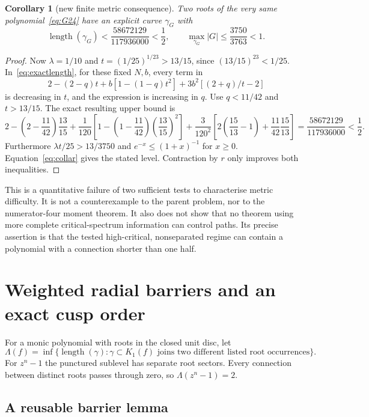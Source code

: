 \documentclass[11pt,a4paper]{article}
\newtheorem{corollary}[theorem]{Corollary}
\theoremstyle{remark}\newtheorem{remark}[theorem]{Remark}
\newcommand{\length}{\operatorname{length}}
\begin{document}
\begin{corollary}[new finite metric consequence]\label{cor:24}
Two roots of the very same polynomial~\eqref{eq:G24} have an explicit curve
$\gamma_G$ with
\[
 \length(\gamma_G)
 <\frac{58672129}{117936000}<\frac12,
 \qquad
 \max_{\gamma_G}|G|\le\frac{3750}{3763}<1.
\]
\end{corollary}
\begin{proof}
Now $\lambda=1/10$ and $t=(1/25)^{1/23}>13/15$, since
$(13/15)^{23}<1/25$. In~\eqref{eq:exactlength}, for these fixed $N,b$,
every term in
\[
 2-(2-q)t+b[1-(1-q)t^2]+3b^2[(2+q)/t-2]
\]
is decreasing in $t$, and the expression is increasing in $q$.
Use $q<11/42$ and $t>13/15$. The exact resulting upper bound is
\[
 2-\left(2-\frac{11}{42}\right)\frac{13}{15}
 +\frac1{120}\left[1-\left(1-\frac{11}{42}\right)
                 \left(\frac{13}{15}\right)^2\right]
 +\frac3{120^2}\left[2\left(\frac{15}{13}-1\right)
                    +\frac{11}{42}\frac{15}{13}\right]
 =\frac{58672129}{117936000}<\frac12.
\]
Furthermore $\lambda t/25>13/3750$ and $e^{-x}\le(1+x)^{-1}$ for $x\ge0$.
Equation~\eqref{eq:collar} gives the stated level. Contraction by $r$ only
improves both inequalities.
\end{proof}

This is a quantitative failure of two sufficient tests to characterise
metric difficulty. It is not a counterexample to the parent problem, nor
to the numerator-four moment theorem. It also does not show that no theorem
using more complete critical-spectrum information can control paths.
Its precise assertion is that the tested high-critical, nonseparated regime
can contain a polynomial with a connection shorter than one half.

\section{Weighted radial barriers and an exact cusp order}

For a monic polynomial with roots in the closed unit disc, let
\[
 \Lambda(f)=\inf\{\length(\gamma):\gamma\subset K_1(f)
     \text{ joins two different listed root occurrences}\}.
\]
For $z^n-1$ the punctured sublevel has separate root sectors. Every connection
between distinct roots passes through zero, so $\Lambda(z^n-1)=2$.

\subsection{A reusable barrier lemma}
\end{document}

